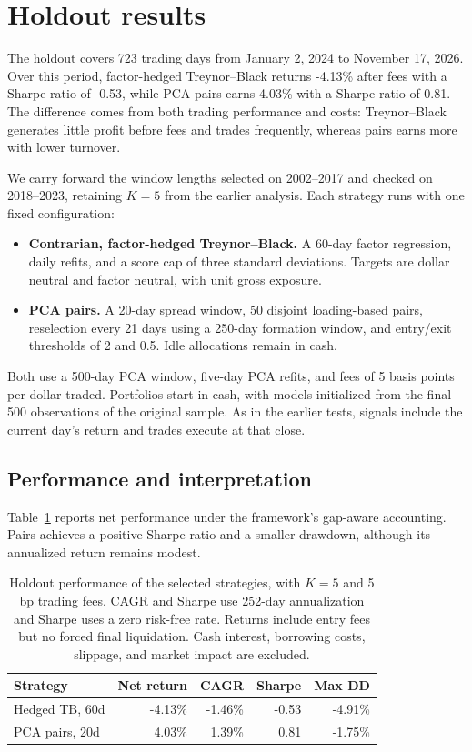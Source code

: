 ﻿\section{Holdout results}
\label{sec:final-holdout}

The holdout covers 723 trading days from January 2, 2024 to November 17,
2026. Over this period, factor-hedged Treynor--Black returns -4.13\%
after fees with a Sharpe ratio of -0.53, while PCA pairs earns
4.03\% with a Sharpe ratio of 0.81. The difference comes from
both trading performance and costs: Treynor--Black generates little profit
before fees and trades frequently, whereas pairs earns more with lower
turnover.

We carry forward the window lengths selected on 2002--2017 and checked on
2018--2023, retaining $K=5$ from the earlier analysis. Each strategy runs with
one fixed configuration:
\begin{itemize}
    \item \textbf{Contrarian, factor-hedged Treynor--Black.} A 60-day
    factor regression, daily refits, and a score cap of three standard
    deviations. Targets are dollar neutral and factor neutral, with unit
    gross exposure.
    \item \textbf{PCA pairs.} A 20-day spread window, 50 disjoint
    loading-based pairs, reselection every 21 days using a 250-day formation
    window, and entry/exit thresholds of 2 and 0.5. Idle allocations remain
    in cash.
\end{itemize}
Both use a 500-day PCA window, five-day PCA refits, and fees of 5 basis
points per dollar traded. Portfolios start in cash, with models initialized
from the final 500 observations of the original sample. As in the earlier
tests, signals include the current day's return and trades execute at that
close.

\subsection{Performance and interpretation}

Table~\ref{tab:final-holdout} reports net performance under the framework's
gap-aware accounting. Pairs achieves a positive Sharpe ratio and a smaller
drawdown, although its annualized return remains modest.

\begin{table}[htbp]
\centering
\small
\begin{tabular}{lrrrr}
\toprule
Strategy & Net return & CAGR & Sharpe & Max DD \\
\midrule
Hedged TB, 60d & -4.13\% & -1.46\% & -0.53 & -4.91\% \\
PCA pairs, 20d & 4.03\% & 1.39\% & 0.81 & -1.75\% \\
\bottomrule
\end{tabular}
\caption{Holdout performance of the selected strategies, with $K=5$ and
5 bp trading fees. CAGR and Sharpe use 252-day annualization and Sharpe uses
a zero risk-free rate. Returns include entry fees but no forced final
liquidation. Cash interest, borrowing costs, slippage, and market impact
are excluded.}
\label{tab:final-holdout}
\end{table}

